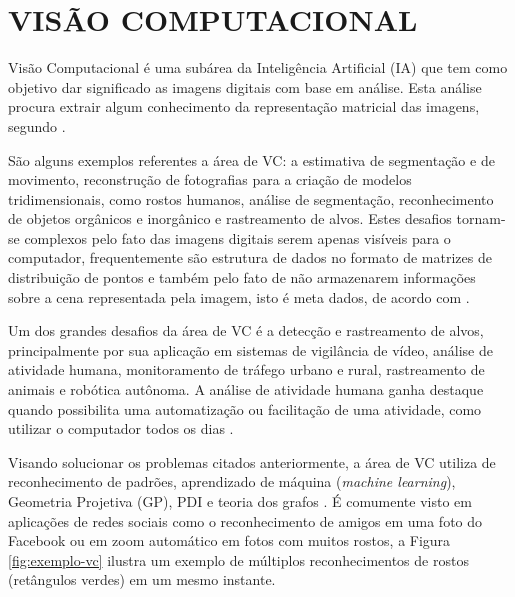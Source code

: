 \section{VISÃO COMPUTACIONAL}\label{Sub:vc}

Visão Computacional é uma subárea da Inteligência Artificial (IA) que tem como objetivo dar significado as imagens digitais com base em análise. Esta análise procura extrair algum conhecimento da representação matricial das imagens, segundo . 

São alguns exemplos referentes a área de VC: a estimativa de segmentação e de movimento, reconstrução de fotografias para a criação de modelos tridimensionais, como rostos humanos, análise de segmentação, reconhecimento de objetos orgânicos e inorgânico e rastreamento de alvos. Estes desafios tornam-se complexos pelo fato das imagens digitais serem apenas visíveis para o computador, frequentemente são estrutura de dados no formato de matrizes de distribuição de pontos e também pelo fato de não armazenarem informações sobre a cena representada pela imagem, isto é meta dados, de acordo com .

Um dos grandes desafios da área de VC é a detecção e rastreamento de alvos, principalmente por sua aplicação em sistemas de vigilância de vídeo, análise de atividade humana, monitoramento de tráfego urbano e rural, rastreamento de animais e robótica autônoma. A análise de atividade humana ganha destaque quando possibilita uma automatização ou facilitação de uma atividade, como utilizar o computador todos os dias \cite{alaya2012multipeople-UPPERCASE}.

Visando solucionar os problemas citados anteriormente, a área de VC utiliza de reconhecimento de padrões, aprendizado de máquina (\textit{machine learning}), Geometria Projetiva (GP), PDI e teoria dos grafos \cite{prince2012computer}. É comumente visto em aplicações de redes sociais como o reconhecimento de amigos em uma foto do Facebook ou em zoom automático em fotos com muitos rostos, a Figura \ref{fig:exemplo-vc} ilustra um exemplo de múltiplos reconhecimentos de rostos (retângulos verdes) em um mesmo instante.

